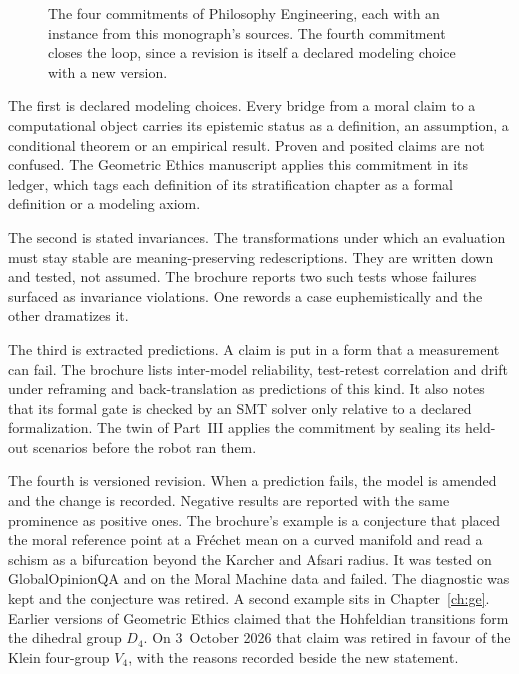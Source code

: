 \begin{figure}[t]
\centering

\caption{The four commitments of Philosophy Engineering, each with an instance from this
monograph's sources. The fourth commitment closes the loop, since a revision is itself a declared
modeling choice with a new version.}
\label{fig:pe-commitments}
\end{figure}

The first is declared modeling choices. Every bridge from a moral claim to a computational object
carries its epistemic status as a definition, an assumption, a conditional theorem or an
empirical result. Proven and posited claims are not confused.
The Geometric Ethics manuscript applies this commitment in its ledger, which tags each
definition of its stratification chapter as a formal definition or a modeling axiom.

The second is stated invariances. The transformations under which an evaluation must stay stable
are meaning-preserving redescriptions. They are written down and tested, not assumed.
The brochure reports two such tests whose failures surfaced as invariance violations. One
rewords a case euphemistically and the other dramatizes it.

The third is extracted predictions. A claim is put in a form that a measurement can fail. The
brochure lists inter-model reliability, test-retest correlation and drift under reframing and
back-translation as predictions of this kind. It also notes that its formal gate is checked by an
SMT solver only relative to a declared formalization.
The twin of Part~III applies the commitment by sealing its held-out scenarios before the robot
ran them.

The fourth is versioned revision. When a prediction fails, the model is amended and the change is
recorded. Negative results are reported with the same prominence as positive ones.
The brochure's example is a conjecture that placed the moral reference point at a Fr\'echet mean
on a curved manifold and read a schism as a bifurcation beyond the Karcher and Afsari radius. It
was tested on GlobalOpinionQA and on the Moral Machine data and failed. The diagnostic was kept
and the conjecture was retired.
A second example sits in Chapter~\ref{ch:ge}. Earlier versions of Geometric Ethics claimed that
the Hohfeldian transitions form the dihedral group $D_4$. On 3~October 2026 that claim was retired
in favour of the Klein four-group $V_4$, with the reasons recorded beside the new statement.


